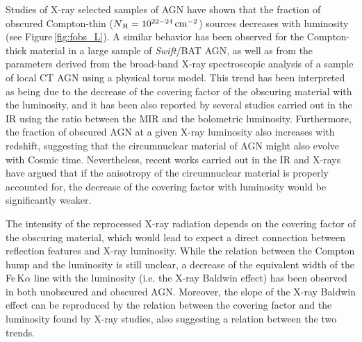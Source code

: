 \documentclass{natureprintstyle}
\begin{document}
Studies of X-ray selected samples of AGN have shown that the fraction of obscured Compton-thin ($N_{\rm\,H}=10^{22-24}\rm\,cm^{-2}$) sources decreases with luminosity\cite{La-Franca:2005kl,Akylas:2006gd,Burlon:2011dk,Merloni:2014wq,Ueda:2014ix} (see Figure\,\ref{fig:fobs_L}). A similar behavior has been observed for the Compton-thick material in a large sample of {\it Swift}/BAT AGN\cite{Ricci:2015tg}, as well as from the parameters derived from the broad-band X-ray spectroscopic analysis of a sample of local CT AGN using a physical torus model\cite{Brightman:2015fv}. 
This trend has been interpreted as being due to the decrease of the covering factor of the obscuring material with the luminosity, and it has been also reported by several studies carried out in the IR using the ratio between the MIR and the bolometric luminosity\cite{Maiolino:2007ye,Treister:2008kc,Lusso:2013vf,Stalevski:2016hl}. Furthermore, the fraction of obscured AGN at a given X-ray luminosity also increases with redshift\cite{Ueda:2014ix}, suggesting that the circumnuclear material of AGN might also evolve with Cosmic time.
Nevertheless, recent works carried out in the IR\cite{Stalevski:2016hl} and X-rays\cite{Sazonov:2015ys} have argued that if the anisotropy of the circumnuclear material is properly accounted for, the decrease of the covering factor with luminosity would be significantly weaker.


The intensity of the reprocessed X-ray radiation depends on the covering factor of the obscuring material, which would lead to expect a direct connection between reflection features and X-ray luminosity. While the relation between the Compton hump and the luminosity is still unclear, a decrease of the equivalent width of the Fe\,K$\alpha$ line with the luminosity (i.e. the X-ray Baldwin effect\cite{Iwasawa:1993ez}) has been observed in both unobscured\cite{Bianchi:2007os,Shu:2010tg} and obscured\cite{Ricci:2014ek} AGN. Moreover, the slope of the X-ray Baldwin effect can be reproduced by the relation between the covering factor and the luminosity found by X-ray studies\cite{Ricci:2013hi}, also suggesting a relation between the two trends. 
\end{document}
